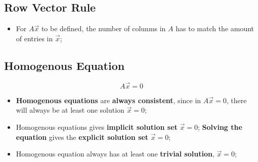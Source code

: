   \subsection{Row Vector Rule}
  
    \begin{itemize}
      \item For $ A \vec{x} $ to be defined, the number of colunms in $ A $ has to match the amount of 
      entries in $ \vec{x} $;
    \end{itemize}
  
  \subsection{Homogenous Equation}
  
    \begin{equation}
      A \vec{x} = 0
    \end{equation}
    
    \begin{itemize}
      \item \textbf{Homogenous equations} are \textbf{always consistent}, since 
      in $ A \vec{x} = 0 $, there will always be at least one solution 
      $ \vec{x} = 0 $;
      
      \item Homogenous equations gives \textbf{implicit solution set} $ \vec{x} = 0 $;
      \textbf{Solving the equation} gives the \textbf{explicit solution set} 
      $ \vec{x} = 0 $;
      
      \item Homogenous equation always has at least one \textbf{trivial solution},
      $ \vec{x} = 0 $;
    \end{itemize}
